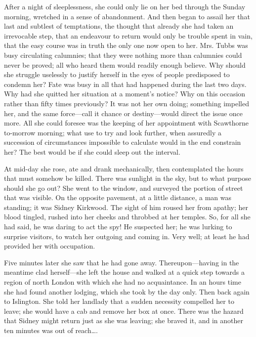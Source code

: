 After a night of sleeplessness, she could only lie on her bed through
the Sunday morning, wretched in a sense of abandonment. And then began
to assail her that last and subtlest of temptations, the thought that
already she had taken an irrevocable
{\protect\hypertarget{229}{}{}}step, that an endeavour to return would
only be trouble spent in vain, that the easy course was in truth the
only one now open to her. Mrs. Tubbs was busy circulating calumnies;
that they were nothing more than calumnies could never be proved; all
who heard them would readily enough believe. Why should she struggle
uselessly to justify herself in the eyes of people predisposed to
condemn her? Fate was busy in all that had happened during the last two
days. Why had she quitted her situation at a moment's notice? Why on
this occasion rather than fifty times previously? It was not her own
doing; something impelled her, and the same force---call it chance or
destiny---would direct the issue once more. All she could foresee was
the keeping of her appointment with Scawthorne to-morrow morning; what
use to try and look further, when assuredly a succession of
circumstances impossible to calculate would in the end constrain her?
The best would be if she could sleep out the interval.

At mid-day she rose, ate and drank
{\protect\hypertarget{230}{}{}}mechanically, then contemplated the hours
that must somehow be killed. There was sunlight in the sky, but to what
purpose should she go out? She went to the window, and surveyed the
portion of street that was visible. On the opposite pavement, at a
little distance, a man was standing; it was Sidney Kirkwood. The sight
of him roused her from apathy; her blood tingled, rushed into her cheeks
and throbbed at her temples. So, for all she had said, he was daring to
act the spy! He suspected her; he was lurking to surprise visitors, to
watch her outgoing and coming in. Very well; at least he had provided
her with occupation.

Five minutes later she saw that he had gone away. Thereupon---having in
the meantime clad herself---she left the house and walked at a quick
step towards a region of north London with which she had no
acquaintance. In an hours time she had found another lodging, which she
took by the day only. Then back again to Islington. She told her
landlady that a sudden necessity compelled
{\protect\hypertarget{231}{}{}}her to leave; she would have a cab and
remove her box at once. There was the hazard that Sidney might return
just as she was leaving; she braved it, and in another ten minutes was
out of reach\ldots{}.

